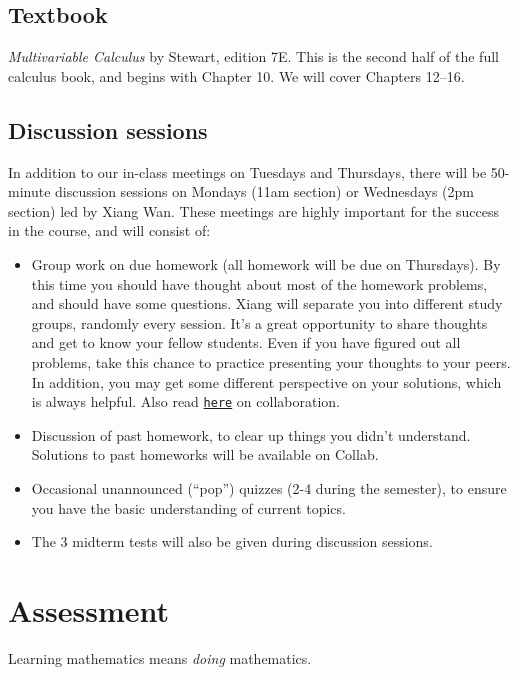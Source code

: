 \documentclass[oneside,11pt]{amsart}
\begin{document}

\subsection{Textbook}

\emph{Multivariable Calculus} by Stewart, edition 7E. This is the second half of the full calculus book, and begins with Chapter 10. We will cover Chapters 12--16.

\subsection{Discussion sessions} 

In addition to our in-class meetings on Tuesdays and Thursdays, there will be 50-minute discussion sessions on Mondays (11am section) or Wednesdays (2pm section) led by Xiang Wan. These meetings are highly important for the success in the course, and will consist of:
\begin{itemize}
	\item 
	Group work on due homework (all homework will be due on Thursdays). By this time you should have thought about most of the homework problems, and should have some questions. Xiang will separate you into different study groups, randomly every session. It’s a great opportunity to share thoughts and get to know your fellow students. Even if you have figured out all problems, take this chance to practice presenting your thoughts to your peers. In addition, you may get some different perspective on your solutions, which is always helpful. Also read \hyperref[academic_integrity]{\texttt{here}} on collaboration.
	\item 
	Discussion of past homework, to clear up things you didn't understand. Solutions to past homeworks will be available on Collab.
	\item Occasional unannounced (``pop'') quizzes (2-4 during the semester), to ensure you have the basic understanding of current topics.
	\item The 3 midterm tests will also be given during discussion sessions.
\end{itemize}

\section{Assessment}

Learning mathematics means \emph{doing} mathematics. 
\end{document}
